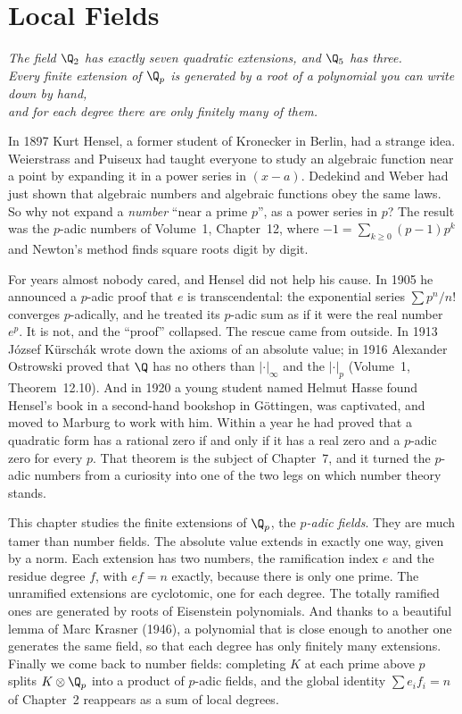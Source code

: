 \chapter{Local Fields}
\begin{center}\itshape
The field $\Q_2$ has exactly seven quadratic extensions, and $\Q_5$ has three.\\
Every finite extension of $\Q_p$ is generated by a root of a polynomial you can write down by hand,\\
and for each degree there are only finitely many of them.
\end{center}

In 1897 Kurt Hensel, a former student of Kronecker in Berlin, had a strange idea. Weierstrass and Puiseux had taught
everyone to study an algebraic function near a point by expanding it in a power series in $(x-a)$. Dedekind and Weber had
just shown that algebraic numbers and algebraic functions obey the same laws. So why not expand a \emph{number} ``near a
prime $p$'', as a power series in $p$? The result was the $p$-adic numbers of Volume~1, Chapter~12, where $-1=\sum_{k\ge0}
(p-1)p^k$ and Newton's method finds square roots digit by digit.

For years almost nobody cared, and Hensel did not help his cause. In 1905 he announced a $p$-adic proof that $e$ is
transcendental: the exponential series $\sum p^n/n!$ converges $p$-adically, and he treated its $p$-adic sum as if it were
the real number $e^p$. It is not, and the ``proof'' collapsed. The rescue came from outside. In 1913 J\'ozsef K\"ursch\'ak
wrote down the axioms of an absolute value; in 1916 Alexander Ostrowski proved that $\Q$ has no others than $|\cdot|_\infty$
and the $|\cdot|_p$ (Volume~1, Theorem~12.10). And in 1920 a young student named Helmut Hasse found Hensel's book in a
second-hand bookshop in G\"ottingen, was captivated, and moved to Marburg to work with him. Within a year he had proved that
a quadratic form has a rational zero if and only if it has a real zero and a $p$-adic zero for every $p$. That theorem is the
subject of Chapter~7, and it turned the $p$-adic numbers from a curiosity into one of the two legs on which number theory
stands.

This chapter studies the finite extensions of $\Q_p$, the \emph{$p$-adic fields}. They are much tamer than number fields.
The absolute value extends in exactly one way, given by a norm. Each extension has two numbers, the ramification index $e$
and the residue degree $f$, with $ef=n$ exactly, because there is only one prime. The unramified extensions are cyclotomic,
one for each degree. The totally ramified ones are generated by roots of Eisenstein polynomials. And thanks to a beautiful
lemma of Marc Krasner (1946), a polynomial that is close enough to another one generates the same field, so that each
degree has only finitely many extensions. Finally we come back to number fields: completing $K$ at each prime above $p$
splits $K\otimes\Q_p$ into a product of $p$-adic fields, and the global identity $\sum e_if_i=n$ of Chapter~2 reappears as a
sum of local degrees.


